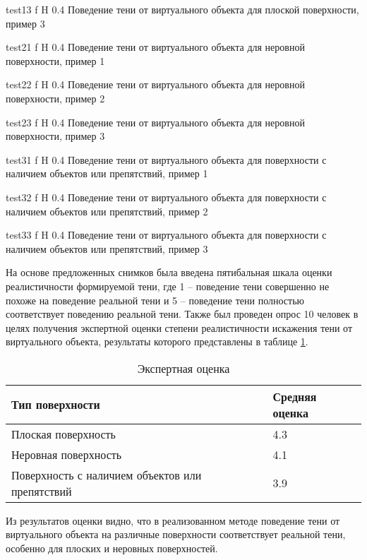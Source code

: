 {test13}
{f}
{H}
{0.4\textwidth}
{Поведение тени от виртуального объекта для плоской поверхности, пример 3}

{test21}
{f}
{H}
{0.4\textwidth}
{Поведение тени от виртуального объекта для неровной поверхности, пример 1}

{test22}
{f}
{H}
{0.4\textwidth}
{Поведение тени от виртуального объекта для неровной поверхности, пример 2}

{test23}
{f}
{H}
{0.4\textwidth}
{Поведение тени от виртуального объекта для неровной поверхности, пример 3}

{test31}
{f}
{H}
{0.4\textwidth}
{Поведение тени от виртуального объекта для поверхности с наличием объектов или препятствий, пример 1}

{test32}
{f}
{H}
{0.4\textwidth}
{Поведение тени от виртуального объекта для поверхности с наличием объектов или препятствий, пример 2}

{test33}
{f}
{H}
{0.4\textwidth}
{Поведение тени от виртуального объекта для поверхности с наличием объектов или препятствий, пример 3}

На основе предложенных снимков была введена пятибальная шкала оценки реалистичности формируемой тени, где 1 -- поведение тени совершенно не похоже на поведение реальной тени и 5 -- поведение тени полностью соответствует поведению реальной тени. Также был проведен опрос 10 человек в целях получения экспертной оценки степени реалистичности искажения тени от виртуального объекта, результаты которого представлены в таблице \ref{Otsenka}.

\begin{table}[H]
	\caption{Экспертная оценка}
	\label{Otsenka}
	\begin{center}
		\begin{tabular}{| p{8 cm} | p{3.5 cm} |} 
			\hline
			Тип поверхности & Средняя оценка \\
			\hline
			Плоская поверхность & 4.3 \\
			\hline
			Неровная поверхность & 4.1 \\
			\hline
			Поверхность с наличием объектов или препятствий & 3.9 \\
			\hline
		\end{tabular}
	\end{center}
\end{table}

Из результатов оценки видно, что в реализованном методе поведение тени от виртуального объекта на различные поверхности соответствует реальной тени, особенно для плоских и неровных поверхностей.


